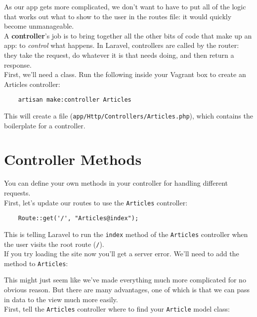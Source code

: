 As our app gets more complicated, we don't want to have to put all of the logic that works out what to show to the user in the routes file: it would quickly become unmanageable.
\\

A \textbf{controller}'s job is to bring together all the other bits of code that make up an app: to \textit{control} what happens. In Laravel, controllers are called by the router: they take the request, do whatever it is that needs doing, and then return a response.
\\

First, we'll need a class. Run the following inside your Vagrant box to create an Articles controller:

\begin{verbatim}
    artisan make:controller Articles
\end{verbatim}

This will create a file (\texttt{app/Http/Controllers/Articles.php}), which contains the boilerplate for a controller.

\section{Controller Methods}

You can define your own methods in your controller for handling different requests.
\\

First, let's update our routes to use the \texttt{Articles} controller:

\begin{verbatim}
    Route::get('/', "Articles@index");
\end{verbatim}

This is telling Laravel to run the \texttt{index} method of the \texttt{Articles} controller when the user visits the root route (\texttt{/}).
\\

If you try loading the site now you'll get a server error. We'll need to add the method to \texttt{Articles}:


This might just seem like we've made everything much more complicated for no obvious reason. But there are many advantages, one of which is that we can pass in data to the view much more easily.
\\

First, tell the \texttt{Articles} controller where to find your \texttt{Article} model class:

